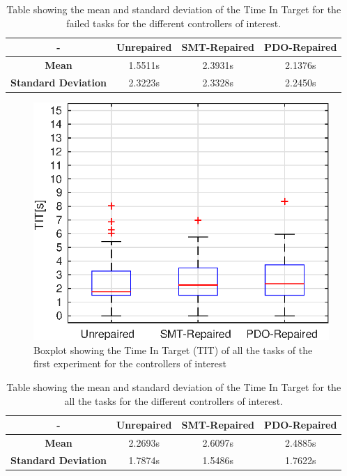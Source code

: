 \begin{table}[H]
    \centering
    \begin{tabular}{|c|c|c|c|}
        \hline
        - & \textbf{Unrepaired} & \textbf{SMT-Repaired} & \textbf{PDO-Repaired} \\
        \hline
        \textbf{Mean} & 1.5511s & 2.3931s & 2.1376s \\
        \textbf{Standard Deviation} & 2.3223s & 2.3328s & 2.2450s \\
        \hline
    \end{tabular}
    \caption{Table showing the mean and standard deviation of the Time In Target for the failed tasks for the different controllers of interest.}
    \label{tab:TIT-fail-first-mean-std}
\end{table}
\begin{figure}[H]
    \centering
    \includegraphics[width=\textwidth]{Images/first-experiment/exp0_TIT.eps}
    \caption{Boxplot showing the Time In Target (TIT) of all the tasks of the first experiment for the controllers of interest}
    \label{fig:box-TIT-all-first}
\end{figure}
\begin{table}[H]
    \centering
    \begin{tabular}{|c|c|c|c|}
        \hline
        - & \textbf{Unrepaired} & \textbf{SMT-Repaired} & \textbf{PDO-Repaired} \\
        \hline
        \textbf{Mean} & 2.2693s & 2.6097s & 2.4885s \\
        \textbf{Standard Deviation} & 1.7874s & 1.5486s & 1.7622s \\
        \hline
    \end{tabular}
    \caption{Table showing the mean and standard deviation of the Time In Target for the all the tasks for the different controllers of interest.}
    \label{tab:TIT-all-first-mean-std}
\end{table}
